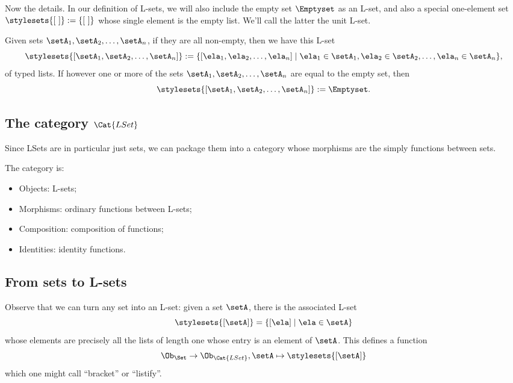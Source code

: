Now the details.
In our definition of L-sets, we will also include the empty set $\Emptyset$ as an L-set, and also a special one-element set $\stylesets{[ \ ]} := \{ [ \ ] \}$ whose single element is the empty list.
We'll call the latter the unit L-set.

Given sets $\setA_1, \setA_2, \dots , \setA_n$, if they are all non-empty, then we have this L-set
\begin{equation}
    \stylesets{[\setA_1, \setA_2, \dots, \setA_n]} := \{ [ \ela_1, \ela_2, \dots, \ela_n] \mid \ela_1 \in \setA_1, \ela_2 \in \setA_2, \dots, \ela_n \in \setA_n \},
\end{equation}
of typed lists.
If however one or more of the sets $\setA_1, \setA_2, \dots , \setA_n$ are equal to the empty set, then \begin{equation}
    \stylesets{[\setA_1, \setA_2, \dots, \setA_n]} := \Emptyset.
\end{equation}

\subsection{The category $\Cat{LSet}$}

Since LSets are in particular just sets, we can package them into a category whose morphisms are the simply functions between sets.

\begin{ctdefinition}
    The category  is:

    \begin{itemize}
        \item Objects: L-sets;
        \item Morphisms: ordinary functions between L-sets;
        \item Composition: composition of functions;
        \item Identities: identity functions.
    \end{itemize}
\end{ctdefinition}

\subsection{From sets to L-sets}

Observe that we can turn any set into an L-set: given a set $\setA$, there is the associated L-set 
\begin{equation}
\stylesets{[\setA]} = \{ [\ela] \mid \ela \in \setA \}
\end{equation}
whose elements are precisely all the lists of length one whose entry is an element of $\setA$. This defines a function
\begin{equation}
\Ob_{\Set} \to \Ob_{\Cat{LSet}}, \setA \mapsto \stylesets{[\setA]}
\end{equation}
which one might call ``bracket'' or ``listify''. 

